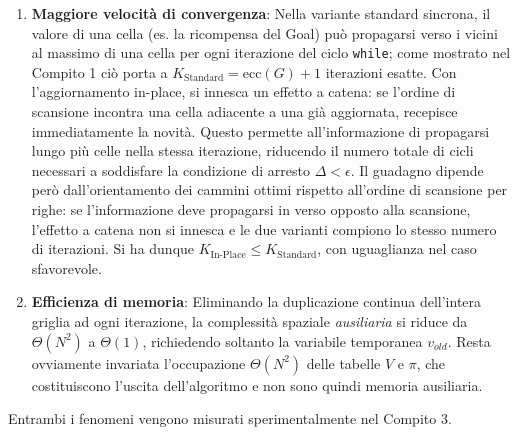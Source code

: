 \begin{enumerate}
    \item \textbf{Maggiore velocità di convergenza}:
    Nella variante standard sincrona, il valore di una cella (es. la ricompensa del Goal) può propagarsi verso i vicini al massimo di una cella per ogni iterazione del ciclo \texttt{while}; come mostrato nel Compito 1 ciò porta a $K_{\text{Standard}} = \text{ecc}(G) + 1$ iterazioni esatte. Con l'aggiornamento in-place, si innesca un effetto a catena: se l'ordine di scansione incontra una cella adiacente a una già aggiornata, recepisce immediatamente la novità. Questo permette all'informazione di propagarsi lungo più celle nella stessa iterazione, riducendo il numero totale di cicli necessari a soddisfare la condizione di arresto $\Delta < \epsilon$.
    Il guadagno dipende però dall'orientamento dei cammini ottimi rispetto all'ordine di scansione per righe: se l'informazione deve propagarsi in verso opposto alla scansione, l'effetto a catena non si innesca e le due varianti compiono lo stesso numero di iterazioni. Si ha dunque $K_{\text{In-Place}} \le K_{\text{Standard}}$, con uguaglianza nel caso sfavorevole.

    \item \textbf{Efficienza di memoria}:
    Eliminando la duplicazione continua dell'intera griglia ad ogni iterazione, la complessità spaziale \textit{ausiliaria} si riduce da $\Theta(N^2)$ a $\Theta(1)$, richiedendo soltanto la variabile temporanea $v_{old}$. Resta ovviamente invariata l'occupazione $\Theta(N^2)$ delle tabelle $V$ e $\pi$, che costituiscono l'uscita dell'algoritmo e non sono quindi memoria ausiliaria.

\end{enumerate}

\noindent
Entrambi i fenomeni vengono misurati sperimentalmente nel Compito 3.
